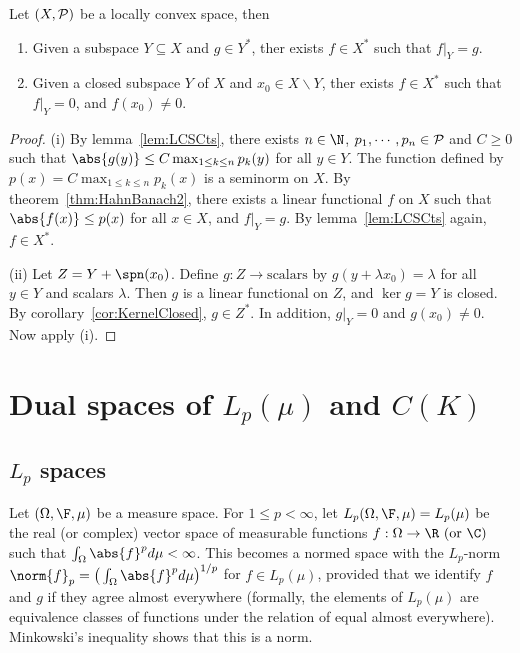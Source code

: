 \documentclass[a4paper]{article}
\begin{document}
{\begin{nthm}\label{thm:HahnBanach4}
	Let $(X,\P)$ be a locally convex space, then
	\begin{enumerate}[nosep,label=(\roman*)]
		\item Given a subspace $Y\subseteq X$ and $g\in Y^*$, ther exists $f\in X^*$ such that $f|_Y=g$.
		\item Given a closed subspace $Y$ of $X$ and $x_0\in X\backslash Y$, ther exists $f\in X^*$ such that $f|_Y=0$, and $f(x_0)\not= 0$.
	\end{enumerate}
\end{nthm}
\begin{proof}
(i) By lemma~\ref{lem:LCSCts}, there exists $n\in\N$, $p_1,\cdots,p_n\in\P$ and $C\geq 0$ such that $\abs{g(y)}\leq C\max_{1\leq k\leq n}p_k(y)$ for all $y\in Y$. The function defined by $p(x)=C\max_{1\leq k\leq n}p_k(x)$ is a seminorm on $X$. By theorem~\ref{thm:HahnBanach2}, there exists a linear functional $f$ on $X$ such that $\abs{f(x)}\leq p(x)$ for all $x\in X$, and $f|_Y=g$. By lemma~\ref{lem:LCSCts} again, $f\in X^*$.

(ii) Let $Z=Y+\spn(x_0)$. Define $g:Z\to\text{scalars}$ by $g(y+\lambda x_0)=\lambda$ for all $y\in Y$ and scalars $\lambda$. Then $g$ is a linear functional on $Z$, and $\ker g=Y$ is closed. By corollary~\ref{cor:KernelClosed}, $g\in Z^*$. In addition, $g|_Y=0$ and $g(x_0)\not= 0$. Now apply (i).
\end{proof}
}

\newpage

\section{Dual spaces of $L_p(\mu)$ and $C(K)$}

\subsection*{$L_p$ spaces}
Let $(\Omega,\F,\mu)$ be a measure space. For $1\leq p<\infty$, let $L_p(\Omega,\F,\mu)=L_p(\mu)$ be the real (or complex) vector space of measurable functions $f:\Omega\to\R\ (\text{or }\C)$ such that $\int_\Omega\abs{f}^pd\mu<\infty$. This becomes a normed space with the $L_p$-norm $\norm{f}_p=\big(\int_\Omega\abs{f}^p d\mu\big)^{1/p}$ for $f\in L_p(\mu)$, provided that we identify $f$ and $g$ if they agree almost everywhere (formally, the elements of $L_p(\mu)$ are equivalence classes of functions under the relation of equal almost everywhere). Minkowski's inequality shows that this is a norm.
\end{document}
